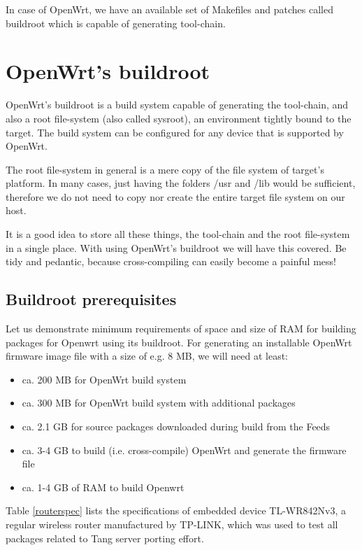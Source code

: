 In case of OpenWrt, we have an available set of Makefiles and patches called buildroot which is capable of generating tool-chain.



\section{OpenWrt's buildroot}

OpenWrt's buildroot is a build system capable of generating the tool-chain, and also a root file-system (also called sysroot), an environment tightly bound to the target.
The build system can be configured for any device that is supported by OpenWrt.

The root file-system in general is a mere copy of the file system of target's platform.
In many cases, just having the folders /usr and /lib would be sufficient, therefore we do not need to copy nor create the entire target file system on our host.

It is a good idea to store all these things, the tool-chain and the root file-system in a single place.
With using OpenWrt's buildroot we will have this covered.
Be tidy and pedantic, because cross-compiling can easily become a painful mess!\cite{fabrizio}



\subsection{Buildroot prerequisites}

Let us demonstrate minimum requirements of space and size of RAM for building packages for Openwrt using its buildroot.
For generating an installable OpenWrt firmware image file with a size of e.g. 8 MB, we will need at least:
\begin{itemize}
\item ca. 200 MB for OpenWrt build system
\item ca. 300 MB for OpenWrt build system with additional packages
\item ca. 2.1 GB for source packages downloaded during build from the Feeds
\item ca. 3-4 GB to build (i.e. cross-compile) OpenWrt and generate the firmware file
\item ca. 1-4 GB of RAM to build Openwrt
\end{itemize}

Table \ref{routerspec} lists the specifications of embedded device TL-WR842Nv3, a regular wireless router manufactured by TP-LINK, which was used to test all packages related to Tang server porting effort.

